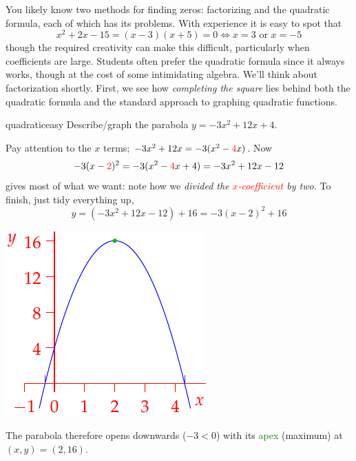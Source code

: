 You likely know two methods for finding zeros: factorizing and the quadratic formula, each of which has its problems. With experience it is easy to spot that 
\[
	x^2+2x-15=(x-3)(x+5)=0\iff x=3\text{ or }x=-5
\]
though the required creativity can make this difficult, particularly when coefficients are large. Students often prefer the quadratic formula since it always works, though at the cost of some intimidating algebra. We'll think about factorization shortly. First, we see how \emph{completing the square} lies behind both the quadratic formula and the standard approach to graphing quadratic functions.

\begin{example}{}{quadraticeasy}
	Describe/graph the parabola $y=-3x^2+12x+4$.\par
	\begin{minipage}[t]{0.62\linewidth}\vspace{-5pt}
		Pay attention to the $x$ terms; $-3x^2+12x=-3(x^2-\textcolor{red}{4}x)$. Now
		\[
			-3(x-\textcolor{red}{2})^2=-3(x^2-\textcolor{red}{4}x+4)=-3x^2+12x-12
		\]
		gives most of what we want: note how we \emph{divided the \textcolor{red}{$x$-coefficient} by two.} To finish, just tidy everything up,
		\[
			y=(-3x^2+12x-12)+16=-3(x-2)^2+16
		\]
	\end{minipage}
	\hfill
	\begin{minipage}[t]{0.27\linewidth}\vspace{-15pt}
		\flushright
		\includegraphics[scale=0.9]{poly-quad2}
	\end{minipage}\medbreak
	The parabola therefore opens downwards ($-3<0$) with its \textcolor{Green}{apex} (maximum) at $(x,y)=(2,16)$.
\end{example}

